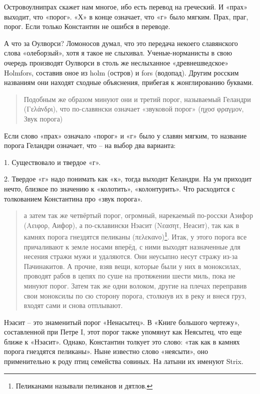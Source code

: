 Островоулнипрах скажет нам многое, ибо есть перевод на греческий. И «прах» выходит, что «порог». «Х» в конце означает, что «г» было мягким. Прах, праг, порог. Если только Константин не ошибся в переводе.

А что за Оулворси? Ломоносов думал, что это передача некоего славянского слова «олеборзый», хотя я такое не слыхивал. Ученые-норманисты в свою очередь производят Оулворси в столь же неслыханное «древнешведское» Holmfors, составив оное из holm (остров) и fors (водопад). Другим росским названиям они находят сходные объяснения, прибегая к жонглированию буквами.

\begin{quotation}
Подобным же образом минуют они и третий порог, называемый Геландри (Γελάνδρι), что по-славянски означает «звуковой порог» (ηχοσ φραγμον, Звук порога)
\end{quotation}

Если слово «прах» означало «порог» и «г» было у славян мягким, то название порога Геландри означает, что – на выбор два варианта:

1. Существовало и твердое «г».

2. Твердое «г» надо понимать как «к», тогда выходит Келандри. На ум приходит нечто, близкое по значению к «колотить», «колонтурить». Что расходится с толкованием Константина про «звук порога».

\begin{quotation}
а затем так же четвёртый порог, огромный, нарекаемый по-росски Аэифор (Αειφορ, Аифор), а по-склавински Нэасит (Νεασητ, Неасит), так как в камнях порога гнездятся пеликаны (πελε\-κανο)\footnote{Пеликанами называли пеликанов и дятлов.}. Итак, у этого порога все причаливают к земле носами вперёд, с ними выходят назначенные для несения стражи мужи и удаляются. Они неусыпно несут стражу из-за Пачинакитов. А прочие, взяв вещи, которые были у них в моноксилах, проводят рабов в цепях по суше на протяжении шести миль, пока не минуют порог. Затем так же одни волоком, другие на плечах переправив свои моноксилы по сю сторону порога, столкнув их в реку и внеся груз, входят сами и снова отплывают. 
\end{quotation}

Нэасит – это знаменитый порог «Ненасытец». В «Книге большого чертежу», составленной при Петре I, этот порог также упомянут как Неясытец, что еще ближе к «Нэасит». Однако, Константин толкует это слово: «так как в камнях порога гнездятся пеликаны». Ныне известно слово «неясыти», оно применительно к роду птиц семейства совиных. На латыни их именуют Strix. 

